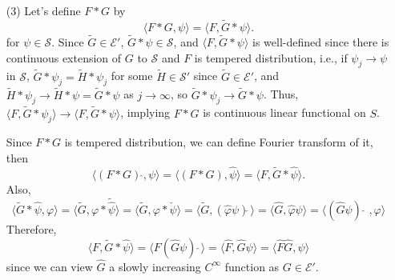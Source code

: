 \documentclass{article}
\begin{document}
\begin{enumerate}
\begin{proof}
\begin{equation*}
\langle{(H*\psi)}\,\widehat{}, \varphi\rangle=\langle H*\psi, \hat{\varphi}\rangle=\langle H, \hat{\varphi}*\tilde{\psi}\rangle=\langle H, \left(\varphi*\check{\tilde{\psi}}\right)\,\widehat{}~\rangle=\langle \hat{H},\varphi*\hat{\psi}\rangle=\langle\hat{\psi}\hat{H},\varphi\rangle
\end{equation*}
for $\varphi\in \mathcal{S}$. It implies $(G*\psi)\,\widehat{}=\hat{\psi}\hat{G}$.(Direct approach)...
\end{proof}
\item[(3)]
Let's define $F*G$ by
\begin{equation*}
\langle F*G,\psi\rangle=\langle F,\tilde{G}*\psi\rangle.
\end{equation*}
for $\psi\in \mathcal{S}$. Since $\tilde{G}\in \mathcal{E}'$, $\tilde{G}*\psi\in \mathcal{S}$, and $\langle F,\tilde{G}*\psi\rangle$ is well-defined since there is continuous extension of $G$ to $\mathcal{S}$ and $F$ is tempered distribution, i.e., if $\psi_j\rightarrow \psi$ in $\mathcal{S}$, $\tilde{G}*\psi_j=\tilde{H}*\psi_j$ for some $\tilde{H}\in \mathcal{S}'$ since $\tilde{G}\in \mathcal{E}'$, and $\tilde{H}*\psi_j\rightarrow \tilde{H}*\psi=\tilde{G}*\psi$ as $j\rightarrow \infty$, so $\tilde{G}*\psi_j\rightarrow \tilde{G}*\psi$. Thus, $\langle F,\tilde{G}*\psi_j\rangle\rightarrow \langle F,\tilde{G}*\psi\rangle$, implying $F*G$ is continuous linear functional on $S$.

Since $F*G$ is tempered distribution, we can define Fourier transform of it, then
\begin{equation*}
\langle(F*G)\,\widehat{}, \psi\rangle=\langle(F*G), \hat{\psi}\rangle=\langle F, \tilde{G}*\hat{\psi}\rangle.
\end{equation*}
Also,
\begin{equation*}
\langle \tilde{G}*\hat{\psi}, \varphi\rangle=\langle \tilde{G}, \varphi*\tilde{\hat{\psi}}\rangle=\langle \tilde{G}, \varphi*\check{\psi}\rangle=\langle \tilde{G}, (\hat{\varphi}\psi)\check{}\,\rangle=\langle \hat{G}, \hat{\varphi}\psi\rangle=\langle (\hat{G}\psi)\,\widehat~~, \varphi\rangle
\end{equation*}
Therefore,
\begin{equation*}
\langle F, \tilde{G}*\hat{\psi}\rangle=\langle F(\hat{G}\psi)\,\widehat~\rangle=\langle \hat{F},\hat{G}\psi\rangle=\langle\hat{F}\hat{G},\psi\rangle
\end{equation*}
since we can view $\hat{G}$ a slowly increasing $C^\infty$ function as $G\in \mathcal{E}'$.
\end{enumerate}
\end{document}
